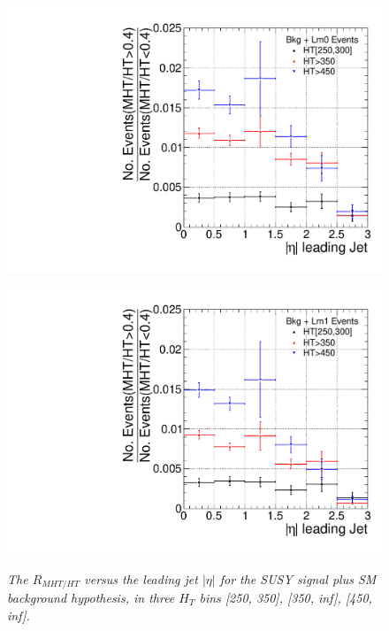 \begin{figure}[h!]
\begin{minipage}[b]{0.5\linewidth}
\centering
{\label{fig:aT}\includegraphics[scale=0.4]{./plots/MHTovHT-NT7-Lm0-MCerr}} 
\end{minipage}
\begin{minipage}[b]{0.5\linewidth}
\centering
{\label{fig:mht}\includegraphics[scale=0.4]{./plots/MHTovHT-NT7-Lm1-MCerr}} 
\end{minipage}
\caption{\textit{The $R_{MHT/HT}$ versus the leading jet $|\eta|$ for the SUSY signal plus SM background hypothesis, in three $H_{T}$ bins [250, 350], [350, inf], [450, inf].} }
\label{fig:app4}
\end{figure}

